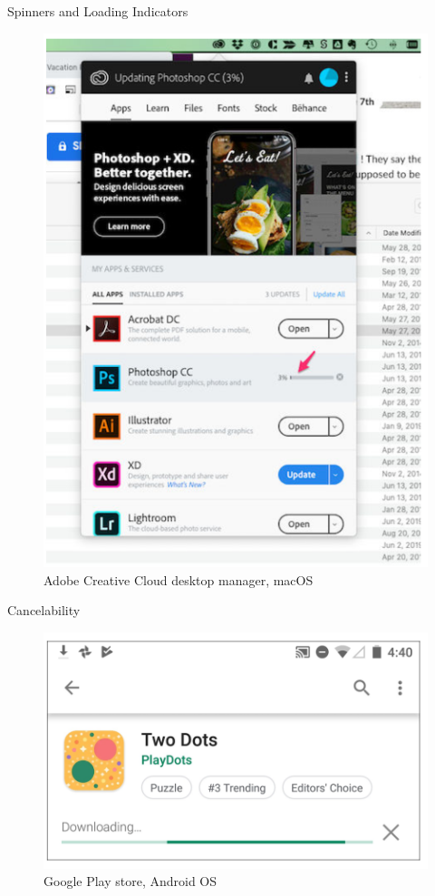 \documentclass{beamer}
\begin{document}
\begin{frame}[t]{Spinners and Loading Indicators}
	\begin{figure}[h]
		\centering
		\includegraphics[scale=0.6]{images/lec08-pic21.png}
		\caption{Adobe Creative Cloud desktop manager, macOS}
	\end{figure}
\end{frame}

\begin{frame}[t]{Cancelability}
	\begin{figure}[h]
		\centering
		\includegraphics[scale=0.6]{images/lec08-pic22.png}
		\caption{Google Play store, Android OS}
	\end{figure}
\end{frame}
\end{document}
